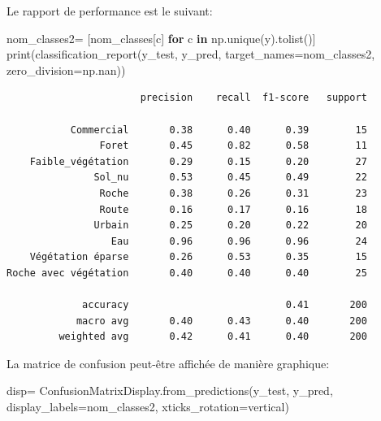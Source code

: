 \documentclass[
  11pt,
  letterpaper,
  open=any,
  twoside=false,
  french]{scrbook}
\newenvironment{Shaded}{\begin{snugshade}}{\end{snugshade}}
\newcommand{\BuiltInTok}[1]{\textcolor[rgb]{0.00,0.23,0.31}{#1}}
\newcommand{\ControlFlowTok}[1]{\textcolor[rgb]{0.00,0.23,0.31}{\textbf{#1}}}
\newcommand{\KeywordTok}[1]{\textcolor[rgb]{0.00,0.23,0.31}{\textbf{#1}}}
\newcommand{\NormalTok}[1]{\textcolor[rgb]{0.00,0.23,0.31}{#1}}
\newcommand{\OperatorTok}[1]{\textcolor[rgb]{0.37,0.37,0.37}{#1}}
\newcommand{\StringTok}[1]{\textcolor[rgb]{0.13,0.47,0.30}{#1}}
\begin{document}
Le rapport de performance est le suivant:

\begin{Shaded}
\begin{Highlighting}[]
\NormalTok{nom\_classes2}\OperatorTok{=}\NormalTok{ [nom\_classes[c] }\ControlFlowTok{for}\NormalTok{ c }\KeywordTok{in}\NormalTok{ np.unique(y).tolist()]}
\BuiltInTok{print}\NormalTok{(classification\_report(y\_test, y\_pred, target\_names}\OperatorTok{=}\NormalTok{nom\_classes2, zero\_division}\OperatorTok{=}\NormalTok{np.nan))}
\end{Highlighting}
\end{Shaded}

\begin{verbatim}
                       precision    recall  f1-score   support

           Commercial       0.38      0.40      0.39        15
                Foret       0.45      0.82      0.58        11
    Faible_végétation       0.29      0.15      0.20        27
               Sol_nu       0.53      0.45      0.49        22
                Roche       0.38      0.26      0.31        23
                Route       0.16      0.17      0.16        18
               Urbain       0.25      0.20      0.22        20
                  Eau       0.96      0.96      0.96        24
    Végétation éparse       0.26      0.53      0.35        15
Roche avec végétation       0.40      0.40      0.40        25

             accuracy                           0.41       200
            macro avg       0.40      0.43      0.40       200
         weighted avg       0.42      0.41      0.40       200
\end{verbatim}

La matrice de confusion peut-être affichée de manière graphique:

\begin{Shaded}
\begin{Highlighting}[]
\NormalTok{disp}\OperatorTok{=}\NormalTok{ ConfusionMatrixDisplay.from\_predictions(y\_test, y\_pred, display\_labels}\OperatorTok{=}\NormalTok{nom\_classes2, xticks\_rotation}\OperatorTok{=}\StringTok{\textquotesingle{}vertical\textquotesingle{}}\NormalTok{)}
\end{Highlighting}
\end{Shaded}
\end{document}
